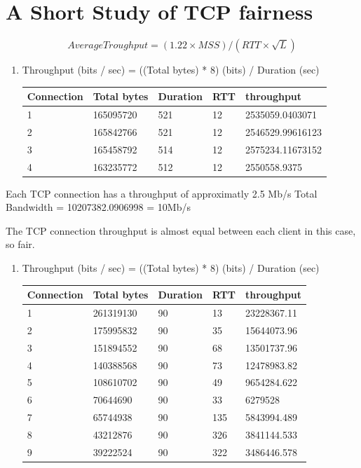 \documentclass[a4paper,11pt,final]{report}
\begin{document}
\chapter{A Short Study of TCP fairness}

\[
Average Troughput = (1.22 \times MSS) / (RTT \times \sqrt{L})
\]

\begin{enumerate}
\def\labelenumi{\arabic{enumi}.}
\setcounter{enumi}{15}
\item
  Throughput (bits / sec) = ((Total bytes) * 8) (bits) / Duration (sec)\\
      \begin{tabular}{|l|l|l|l|l|}
    \hline
        Connection & Total bytes & Duration & RTT & throughput \\ \hline
        1 & 165095720 & 521 & 12 & 2535059.0403071 \\ \hline
        2 & 165842766 & 521 & 12 & 2546529.99616123 \\ \hline
        3 & 165458792 & 514 & 12 & 2575234.11673152 \\ \hline
        4 & 163235772 & 512 & 12 & 2550558.9375 \\ \hline
    \end{tabular}
\end{enumerate}

Each TCP connection has a throughput of approximatly 2.5 Mb/s Total
Bandwidth = 10207382.0906998 = 10Mb/s

The TCP connection throughput is almost equal between each client in
this case, so fair.

\begin{enumerate}
\def\labelenumi{\arabic{enumi}.}
\setcounter{enumi}{16}
\item
  Throughput (bits / sec) = ((Total bytes) * 8) (bits) / Duration (sec)\\
      \begin{tabular}{|l|l|l|l|l|}
    \hline
        Connection & Total bytes & Duration & RTT & throughput \\ \hline
        1 & 261319130 & 90 & 13 & 23228367.11 \\ \hline
        2 & 175995832 & 90 & 35 & 15644073.96 \\ \hline
        3 & 151894552 & 90 & 68 & 13501737.96 \\ \hline
        4 & 140388568 & 90 & 73 & 12478983.82 \\ \hline
        5 & 108610702 & 90 & 49 & 9654284.622 \\ \hline
        6 & 70644690 & 90 & 33 & 6279528 \\ \hline
        7 & 65744938 & 90 & 135 & 5843994.489 \\ \hline
        8 & 43212876 & 90 & 326 & 3841144.533 \\ \hline
        9 & 39222524 & 90 & 322 & 3486446.578 \\ \hline
    \end{tabular}
\end{enumerate}
\end{document}
